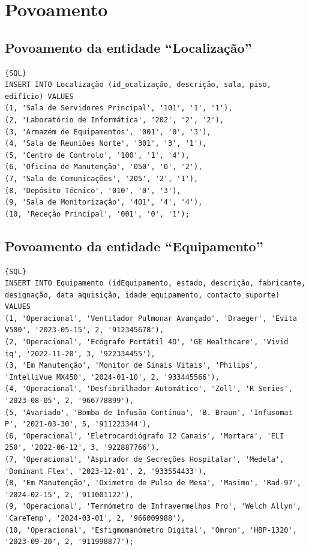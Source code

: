 \chapter{ Povoamento}

\section{Povoamento da entidade “Localização”}
{\small
\begin{lstlisting}{SQL}
INSERT INTO Localização (id_ocalização, descrição, sala, piso, edifício) VALUES
(1, 'Sala de Servidores Principal', '101', '1', '1'),
(2, 'Laboratório de Informática', '202', '2', '2'),
(3, 'Armazém de Equipamentos', '001', '0', '3'),
(4, 'Sala de Reuniões Norte', '301', '3', '1'),
(5, 'Centro de Controlo', '100', '1', '4'),
(6, 'Oficina de Manutenção', '050', '0', '2'),
(7, 'Sala de Comunicações', '205', '2', '1'),
(8, 'Depósito Técnico', '010', '0', '3'),
(9, 'Sala de Monitorização', '401', '4', '4'),
(10, 'Receção Principal', '001', '0', '1');
\end{lstlisting}
}

\section{Povoamento da entidade “Equipamento”}
{\small
\begin{lstlisting}[breaklines]{SQL}
INSERT INTO Equipamento (idEquipamento, estado, descrição, fabricante, designação, data_aquisição, idade_equipamento, contacto_suporte) VALUES
(1, 'Operacional', 'Ventilador Pulmonar Avançado', 'Draeger', 'Evita V500', '2023-05-15', 2, '912345678'),
(2, 'Operacional', 'Ecógrafo Portátil 4D', 'GE Healthcare', 'Vivid iq', '2022-11-20', 3, '922334455'),
(3, 'Em Manutenção', 'Monitor de Sinais Vitais', 'Philips', 'IntelliVue MX450', '2024-01-10', 2, '933445566'),
(4, 'Operacional', 'Desfibrilhador Automático', 'Zoll', 'R Series', '2023-08-05', 2, '966778899'),
(5, 'Avariado', 'Bomba de Infusão Contínua', 'B. Braun', 'Infusomat P', '2021-03-30', 5, '911223344'),
(6, 'Operacional', 'Eletrocardiógrafo 12 Canais', 'Mortara', 'ELI 250', '2022-06-12', 3, '922887766'),
(7, 'Operacional', 'Aspirador de Secreções Hospitalar', 'Medela', 'Dominant Flex', '2023-12-01', 2, '933554433'),
(8, 'Em Manutenção', 'Oximetro de Pulso de Mesa', 'Masimo', 'Rad-97', '2024-02-15', 2, '911001122'),
(9, 'Operacional', 'Termómetro de Infravermelhos Pro', 'Welch Allyn', 'CareTemp', '2024-03-01', 2, '966009988'),
(10, 'Operacional', 'Esfigmomanómetro Digital', 'Omron', 'HBP-1320', '2023-09-20', 2, '911998877');
\end{lstlisting}
}

